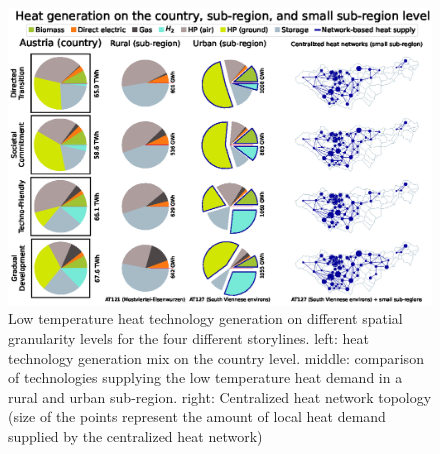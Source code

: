 \begin{figure}
	\centering
	\includegraphics[width=1\linewidth]{figures/4_Results/Spatial_results.eps}
	\caption{Low temperature heat technology generation on different spatial granularity levels for the four different storylines. left: heat technology generation mix on the country level. middle: comparison of technologies supplying the low temperature heat demand in a rural and urban sub-region. right: Centralized heat network topology (size of the points represent the amount of local heat demand supplied by the centralized heat network)}
	\label{fig:res1}
\end{figure}
\newpage
